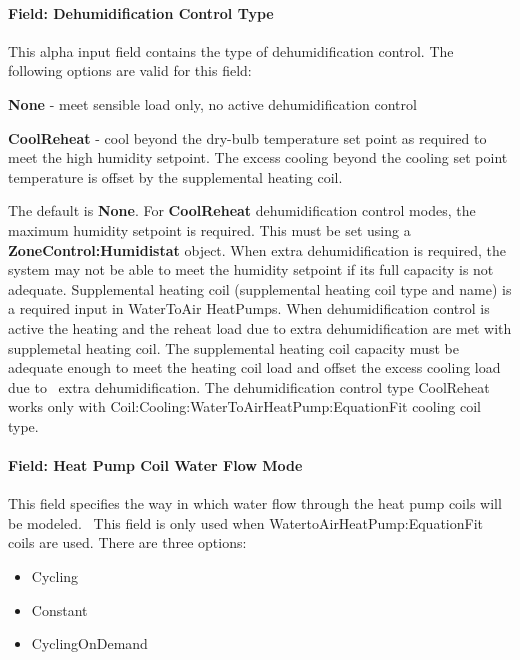 \paragraph{Field: Dehumidification Control Type}\label{field-dehumidification-control-type-4-000}

This alpha input field contains the type of dehumidification control. The following options are valid for this field:

\textbf{None} - meet sensible load only, no active dehumidification control

\textbf{CoolReheat} - cool beyond the dry-bulb temperature set point as required to meet the high humidity setpoint. The excess cooling beyond the cooling set point temperature is offset by the supplemental heating coil.

The default is \textbf{None}. For \textbf{CoolReheat} dehumidification control modes, the maximum humidity setpoint is required. This must be set using a \textbf{ZoneControl:Humidistat} object. When extra dehumidification is required, the system may not be able to meet the humidity setpoint if its full capacity is not adequate. Supplemental heating coil (supplemental heating coil type and name) is a required input in WaterToAir HeatPumps. When dehumidification control is active the heating and the reheat load due to extra dehumidification are met with supplemetal heating coil. The supplemental heating coil capacity must be adequate enough to meet the heating coil load and offset the excess cooling load due to~ extra dehumidification. The dehumidification control type CoolReheat works only with Coil:Cooling:WaterToAirHeatPump:EquationFit cooling coil type.

\paragraph{Field: Heat Pump Coil Water Flow Mode}\label{field-heat-pump-coil-water-flow-mode-000}

This field specifies the way in which water flow through the heat pump coils will be modeled.~ This field is only used when WatertoAirHeatPump:EquationFit coils are used. There are three options:

\begin{itemize}
\item
  Cycling
\item
  Constant
\item
  CyclingOnDemand
\end{itemize}

